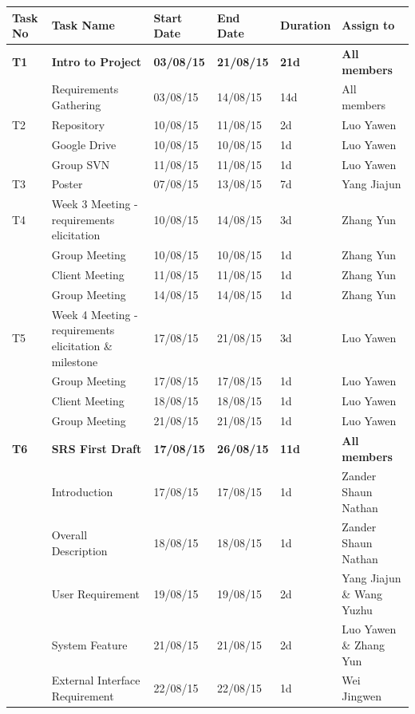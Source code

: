 \documentclass[11pt, a4paper]{article}
\begin{document}
\begin{tabular} 
	 {|p{1.2cm}|p{5cm}|p{1.4cm}|p{1.4cm}|p{1.2cm}|p{4cm}|}
\hline
{Task No} & {Task Name} & {Start Date} & {End Date} & {Duration} & {Assign to}\\
\hline
\textbf{T1} & \textbf{Intro to Project} & \textbf{03/08/15} & \textbf{21/08/15} & \textbf{21d} & \textbf{All members} \\
\hline
{}&{Requirements Gathering} & {03/08/15} & {14/08/15} & {14d} & {All members}\\
\hline
{T2} &{Repository} & {10/08/15}&{11/08/15}&{2d} & {Luo Yawen}\\
\hline
{} &{Google Drive} & {10/08/15}&{10/08/15}&{1d}&{Luo Yawen}\\
\hline
{} &{Group SVN} & {11/08/15}&{11/08/15}&{1d}&{Luo Yawen}\\
\hline
{T3} &{Poster} & {07/08/15}&{13/08/15}&{7d}&{Yang Jiajun} \\
\hline
{T4} &{Week 3 Meeting - requirements elicitation} & {10/08/15}&{14/08/15}&{3d}&{Zhang Yun}\\
\hline
{} &{Group Meeting} & {10/08/15}&{10/08/15}&{1d}&{Zhang Yun}\\
\hline
{} &{Client Meeting} & {11/08/15}&{11/08/15}&{1d}&{Zhang Yun} \\
\hline
{} &{Group Meeting} & {14/08/15}&{14/08/15}&{1d}&{Zhang Yun}\\
\hline
{T5} &{Week 4 Meeting - requirements elicitation \& milestone} & {17/08/15}&{21/08/15}&{3d}&{Luo Yawen}\\
\hline
{} &{Group Meeting} & {17/08/15}&{17/08/15}&{1d}&{Luo Yawen}\\
\hline
{} &{Client Meeting} & {18/08/15}&{18/08/15}&{1d}&{Luo Yawen}\\
\hline
{} &{Group Meeting} & {21/08/15}&{21/08/15}&{1d}&{Luo Yawen}\\
\hline
\textbf{T6} &\textbf{SRS First Draft} & \textbf{17/08/15}&\textbf{26/08/15}&\textbf{11d}&\textbf{All members}\\
\hline
{} &{Introduction} & {17/08/15}&{17/08/15}&{1d}&{Zander Shaun Nathan}\\
\hline
{} &{Overall Description} & {18/08/15}&{18/08/15}&{1d}&{Zander Shaun Nathan}\\
\hline
{} &{User Requirement} & {19/08/15}&{19/08/15}&{2d}&{Yang Jiajun \& Wang Yuzhu}\\
\hline
{} &{System Feature} & {21/08/15}&{21/08/15}&{2d}&{Luo Yawen \& Zhang Yun} \\
\hline 
{} &{External Interface Requirement} & {22/08/15}&{22/08/15}&{1d}&{Wei Jingwen} \\

\end{tabular}
\end{document}
